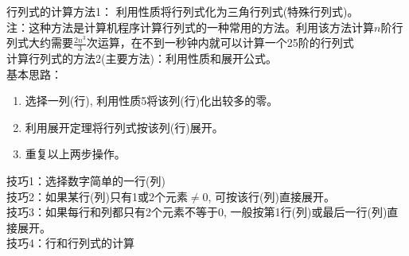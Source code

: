 {\color{blue}行列式的计算方法1：} 利用性质将行列式化为三角行列式(特殊行列式)。\\
{\color{red}注：}这种方法是计算机程序计算行列式的一种常用的方法。利用该方法计算$n$阶行列式大约需要$\frac{2n^{3}}{3}$次运算，在不到一秒钟内就可以计算一个25阶的行列式\\
{\color{blue}计算行列式的方法2(主要方法)：}利用性质和展开公式。 \\
{\color{blue}基本思路：}
\begin{enumerate}
\item{选择一列(行), 利用性质5将该列(行)化出较多的零。}
\item{利用展开定理将行列式按该列(行)展开。}
\item{重复以上两步操作。}
\end{enumerate}
{\color{blue}技巧1：}选择数字简单的一行(列)\\
{\color{blue}技巧2：}如果某行(列)只有1或2个元素$\neq 0$, 可按该行(列)直接展开。\\
{\color{blue}技巧3：}如果每行和列都只有2个元素不等于0, 一般按第1行(列)或最后一行(列)直接展开。\\
{\color{blue}技巧4：}行和行列式的计算
